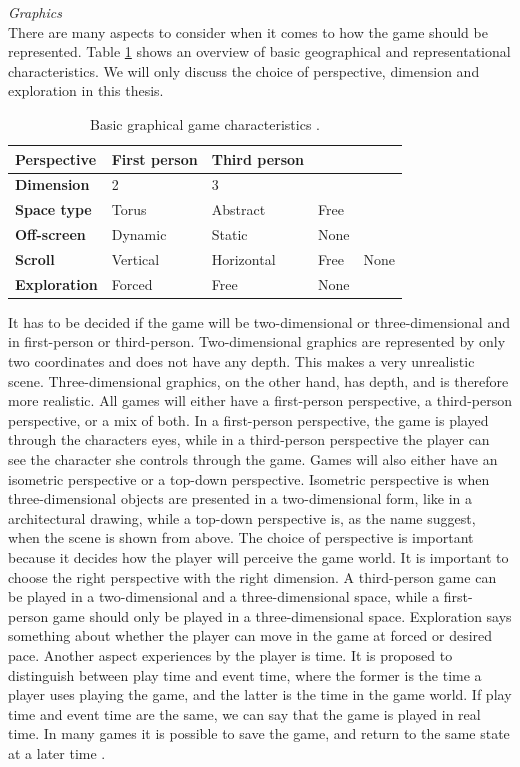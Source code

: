 \emph{Graphics}\\
There are many aspects to consider when it comes to how the game should be represented. Table \ref{tab:graphic} shows an overview of basic geographical and representational characteristics. We will only discuss the choice of perspective, dimension and exploration in this thesis. 

\begin{table}
\centering
    \begin{tabular}{|l|l|l|l|l|}
        \hline
       \textbf{Perspective} & First person & Third person & &  \\ \hline
       \textbf{Dimension} & 2 & 3 & & \\ \hline
       \textbf{Space type} & Torus & Abstract & Free & \\ \hline
	   \textbf{Off-screen} & Dynamic & Static & None & \\ \hline
	   \textbf{Scroll} & Vertical & Horizontal & Free & None \\ \hline
	   \textbf{Exploration} & Forced & Free & None & \\
        \hline
    \end{tabular}
    \caption[Graphical Characteristics]{Basic graphical game characteristics \cite{understandingvg}.}
    \label{tab:graphic}
\end{table} 

It has to be decided if the game will be two-dimensional or three-dimensional and in first-person or third-person. Two-dimensional graphics are represented by only two coordinates and does not have any depth. This makes a very unrealistic scene. Three-dimensional graphics, on the other hand, has depth, and is therefore more realistic. All games will either have a first-person perspective, a third-person perspective, or a mix of both. In a first-person perspective, the game is played through the characters eyes, while in a third-person perspective the player can see the character she controls through the game. Games will also either have an isometric perspective or a top-down perspective. Isometric perspective is when three-dimensional objects are presented in a two-dimensional form, like in a architectural drawing, while a top-down perspective is, as the name suggest, when the scene is shown from above. The choice of perspective is important because it decides how the player will perceive the game world. It is important to choose the right perspective with the right dimension. A third-person game can be played in a two-dimensional and a three-dimensional space, while a first-person game should only be played in a three-dimensional space. Exploration says something about whether the player can move in the game at forced or desired pace. Another aspect experiences by the player is time. It is proposed to distinguish between play time and event time, where the former is the time a player uses playing the game, and the latter is the time in the game world. If play time and event time are the same, we can say that the game is played in real time. In many games it is possible to save the game, and return to the same state at a later time \cite{understandingvg}.

